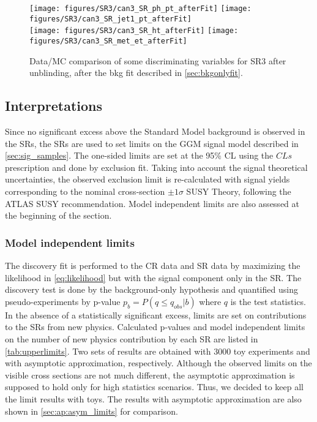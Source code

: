 \begin{figure}[h!]
  \begin{center}
   \texttt{[image: figures/SR3/can3\_SR\_ph\_pt\_afterFit]}
   \texttt{[image: figures/SR3/can3\_SR\_jet1\_pt\_afterFit]}\\
   \texttt{[image: figures/SR3/can3\_SR\_ht\_afterFit]}
   \texttt{[image: figures/SR3/can3\_SR\_met\_et\_afterFit]}
    \caption{Data/MC comparison of some discriminating variables for SR3 after unblinding, after the bkg fit described in \Sec \ref{sec:bkgonlyfit}.}
    \label{fig:unblind_dist_3}
  \end{center}
\end{figure}


\subsection{Interpretations} \label{sec:interpretations}

Since no significant excess above the Standard Model background is observed in the SRs, the SRs are
used to set limits on the GGM signal model described in \Sec \ref{sec:sig_samples}. The one-sided limits
are set at the 95\% CL using the $CLs$ prescription and done by exclusion fit. Taking into account the signal
theoretical uncertainties, the observed exclusion limit is re-calculated with signal
yields corresponding to the nominal cross-section $\pm 1 \sigma$ SUSY Theory, following the ATLAS SUSY recommendation.
Model independent limits are also assessed at the beginning of the section.


\subsubsection{Model independent limits} \label{sec:model_independent}

The discovery fit is performed to the CR data and SR data by maximizing the likelihood in \Eq \ref{eq:likelihood} but
 with the signal component only in the SR. The discovery test is done by the background-only hypothesis
and quantified using pseudo-experiments by p-value $p_b = P(q \leq q_{obs}|b)$ where $q$ is the test statistics.
In the absence of a statistically significant excess, limits are set on contributions to the SRs from new
physics. Calculated p-values and model independent limits on the number of new physics contribution
by each SR are listed in \Tab \ref{tab:upperlimits}. Two sets of results are obtained with 3000 toy experiments and with
asymptotic approximation, respectively. Although the observed limits on the visible cross sections are not much different,
the asymptotic approximation is supposed to hold only for high statistics scenarios. Thus, we decided to keep all the
limit results with toys. The results with asymptotic approximation are also shown in \App \ref{sec:ap:asym_limits} for comparison.

